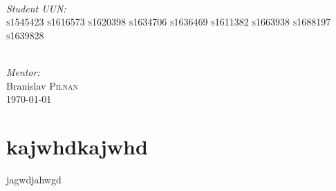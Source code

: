 \documentclass[12pt]{article}
\begin{document}
\begin{titlepage}
\begin{minipage}{0.45\textwidth}
\begin{flushleft}
\end{flushleft}
\end{minipage}
~
\begin{minipage}{0.25\textwidth}
\begin{flushright} \large
\emph{Student UUN:} \\
\textsc{s1545423} 
\textsc{s1616573}
\textsc{s1620398}
\textsc{s1634706}
\textsc{s1636469}
\textsc{s1611382}
\textsc{s1663938}
\textsc{s1688197}
\textsc{s1639828}
\end{flushright}
\end{minipage}\\[1.5cm]


\Large \emph{Mentor:}\\
Branislav \textsc{Pilnan}\\[1cm] 


{\large
\today
}\\[2cm] 

 

\vfill %

\end{titlepage}

\section{kajwhdkajwhd}

jagwdjahwgd
\end{document}
